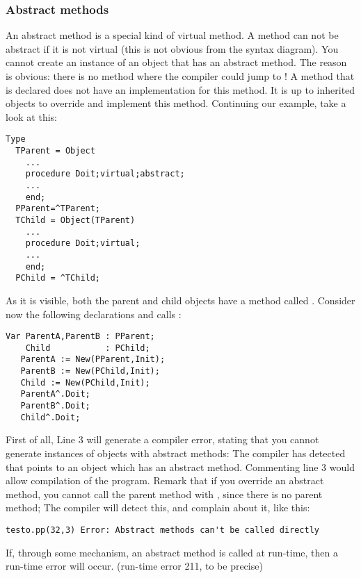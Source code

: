 \documentclass{report}
\begin{document}
\subsubsection{Abstract methods}
An abstract method is a special kind of virtual method. A method can not be
abstract if it is not virtual (this is not obvious from the syntax diagram).
You cannot create an instance of an object that has an abstract method.
The reason is obvious: there is no method where the compiler could jump to !
A method that is declared  does not have an implementation for
this method. It is up to inherited objects to override and implement this
method. Continuing our example, take a look at this:
\begin{verbatim}
Type
  TParent = Object
    ...
    procedure Doit;virtual;abstract;
    ...
    end;
  PParent=^TParent;
  TChild = Object(TParent)
    ...
    procedure Doit;virtual;
    ...
    end;
  PChild = ^TChild;
\end{verbatim}
As it is visible, both the parent and child objects have a method called
. Consider now the following declarations and calls :
\begin{verbatim}
Var ParentA,ParentB : PParent;
    Child           : PChild;
   ParentA := New(PParent,Init);
   ParentB := New(PChild,Init);
   Child := New(PChild,Init);
   ParentA^.Doit;
   ParentB^.Doit;
   Child^.Doit;
\end{verbatim}
First of all, Line 3 will generate a compiler error, stating that you cannot
generate instances of objects with abstract methods: The compiler has
detected that  points to an object which has an abstract
method. Commenting line 3 would allow compilation of the program.
Remark that if you override an abstract method, you cannot call the parent
method with , since there is no parent method; The compiler
will detect this, and complain about it, like this:
\begin{verbatim}
testo.pp(32,3) Error: Abstract methods can't be called directly
\end{verbatim}
If, through some mechanism, an abstract method is called at run-time,
then a run-time error will occur. (run-time error 211, to be precise)

\end{document}
